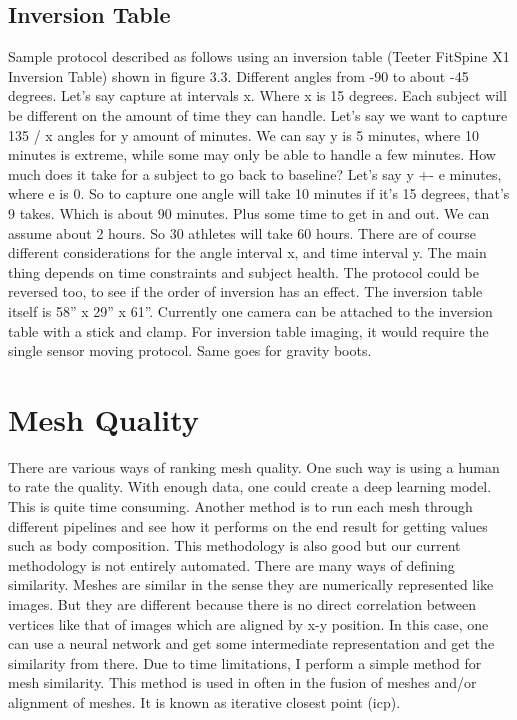 \subsection{Inversion Table}
Sample protocol described as follows using an inversion table (Teeter FitSpine X1 Inversion Table) shown in figure 3.3. Different angles from -90 to about -45 degrees. Let’s say capture at intervals x. Where x is 15 degrees. Each subject will be different on the amount of time they can handle. Let’s say we want to capture 135 / x angles for y amount of minutes. We can say y is 5 minutes, where 10 minutes is extreme, while some may only be able to handle a few minutes. How much does it take for a subject to go back to baseline? Let’s say y +- e minutes, where e is 0. So to capture one angle will take 10 minutes if it’s 15 degrees, that’s 9 takes. Which is about 90 minutes. Plus some time to get in and out. We can assume about 2 hours. So 30 athletes will take 60 hours. There are of course different considerations for the angle interval x, and time interval y. The main thing depends on time constraints and subject health. The protocol could be reversed too, to see if the order of inversion has an effect. The inversion table itself is 58” x 29” x 61”. Currently one camera can be attached to the inversion table with a stick and clamp. For inversion table imaging, it would require the single sensor moving protocol. Same goes for gravity boots. 

\section{Mesh Quality}
There are various ways of ranking mesh quality. One such way is using a human to rate the quality. With enough data, one could create a deep learning model. This is quite time consuming. Another method is to run each mesh through different pipelines and see how it performs on the end result for getting values such as body composition. This methodology is also good but our current methodology is not entirely automated. There are many ways of defining similarity. Meshes are similar in the sense they are numerically represented like images. But they are different because there is no direct correlation between vertices like that of images which are aligned by x-y position. In this case, one can use a neural network and get some intermediate representation and get the similarity from there. Due to time limitations, I perform a simple method for mesh similarity. This method is used in often in the fusion of meshes and/or alignment of meshes. It is known as iterative closest point (icp).

